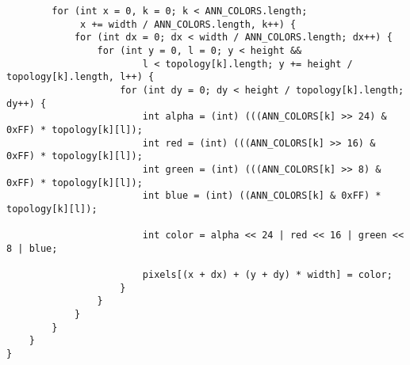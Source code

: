 \begin{verbatim}
        for (int x = 0, k = 0; k < ANN_COLORS.length;
             x += width / ANN_COLORS.length, k++) {
            for (int dx = 0; dx < width / ANN_COLORS.length; dx++) {
                for (int y = 0, l = 0; y < height &&
                        l < topology[k].length; y += height / topology[k].length, l++) {
                    for (int dy = 0; dy < height / topology[k].length; dy++) {
                        int alpha = (int) (((ANN_COLORS[k] >> 24) & 0xFF) * topology[k][l]);
                        int red = (int) (((ANN_COLORS[k] >> 16) & 0xFF) * topology[k][l]);
                        int green = (int) (((ANN_COLORS[k] >> 8) & 0xFF) * topology[k][l]);
                        int blue = (int) ((ANN_COLORS[k] & 0xFF) * topology[k][l]);

                        int color = alpha << 24 | red << 16 | green << 8 | blue;

                        pixels[(x + dx) + (y + dy) * width] = color;
                    }
                }
            }
        }
    }
}
\end{verbatim}

